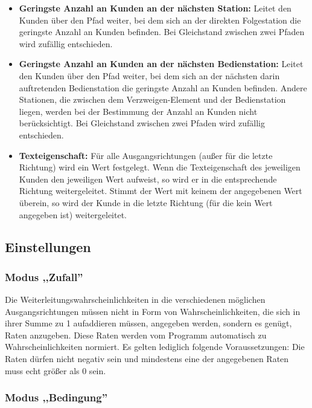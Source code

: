 \begin{itemize}
  \item 
    \textbf{Geringste Anzahl an Kunden an der nächsten Station:}
    Leitet den Kunden über den Pfad weiter, bei dem sich an der direkten Folgestation
    die geringste Anzahl an Kunden befinden. Bei Gleichstand zwischen zwei Pfaden wird
    zufällig entschieden.

  \item 
    \textbf{Geringste Anzahl an Kunden an der nächsten Bedienstation:}
    Leitet den Kunden über den Pfad weiter, bei dem sich an der nächsten
    darin auftretenden Bedienstation die geringste Anzahl an Kunden befinden.
    Andere Stationen, die zwischen dem Verzweigen-Element und der
    Bedienstation liegen, werden bei der Bestimmung der Anzahl an Kunden
    nicht berücksichtigt. Bei Gleichstand zwischen zwei Pfaden wird
    zufällig entschieden.

  \item 
    \textbf{Texteigenschaft:}
    Für alle Ausgangsrichtungen (außer für die letzte Richtung) wird ein Wert festgelegt.
    Wenn die Texteigenschaft des jeweiligen Kunden den jeweiligen Wert aufweist,
    so wird er in die entsprechende Richtung weitergeleitet.
    Stimmt der Wert mit keinem der angegebenen Wert überein,
    so wird der Kunde in die letzte Richtung (für die kein Wert angegeben ist) weitergeleitet.

\end{itemize}

\subsection*{Einstellungen}

\subsubsection*{Modus ,,Zufall''}

Die Weiterleitungswahrscheinlichkeiten in die verschiedenen möglichen Ausgangsrichtungen müssen nicht in
Form von Wahrscheinlichkeiten, die sich in ihrer Summe zu 1 aufaddieren müssen, angegeben werden, sondern
es genügt, Raten anzugeben. Diese Raten werden vom Programm automatisch zu Wahrscheinlichkeiten normiert.
Es gelten lediglich folgende Voraussetzungen: Die Raten dürfen nicht negativ sein und mindestens eine der
angegebenen Raten muss echt größer als 0 sein.

\subsubsection*{Modus ,,Bedingung''}

